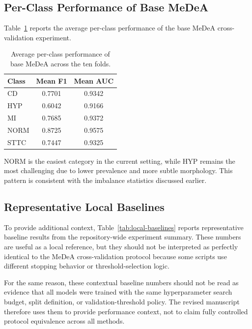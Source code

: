 \documentclass[11pt]{article}
\begin{document}
\subsection{Per-Class Performance of Base MeDeA}

Table~\ref{tab:per-class} reports the average per-class performance of the base MeDeA cross-validation experiment.

\begin{table}[htbp]
\centering
\caption{Average per-class performance of base MeDeA across the ten folds.}
\label{tab:per-class}
\begin{tabular}{lcc}
\toprule
Class & Mean F1 & Mean AUC \\
\midrule
CD & 0.7701 & 0.9342 \\
HYP & 0.6042 & 0.9166 \\
MI & 0.7685 & 0.9372 \\
NORM & 0.8725 & 0.9575 \\
STTC & 0.7447 & 0.9325 \\
\bottomrule
\end{tabular}
\end{table}

NORM is the easiest category in the current setting, while HYP remains the most challenging due to lower prevalence and more subtle morphology. This pattern is consistent with the imbalance statistics discussed earlier.

\subsection{Representative Local Baselines}

To provide additional context, Table~\ref{tab:local-baselines} reports representative baseline results from the repository-wide experiment summary. These numbers are useful as a local reference, but they should not be interpreted as perfectly identical to the MeDeA cross-validation protocol because some scripts use different stopping behavior or threshold-selection logic.

For the same reason, these contextual baseline numbers should not be read as evidence that all models were trained with the same hyperparameter search budget, split definition, or validation-threshold policy. The revised manuscript therefore uses them to provide performance context, not to claim fully controlled protocol equivalence across all methods.
\end{document}
